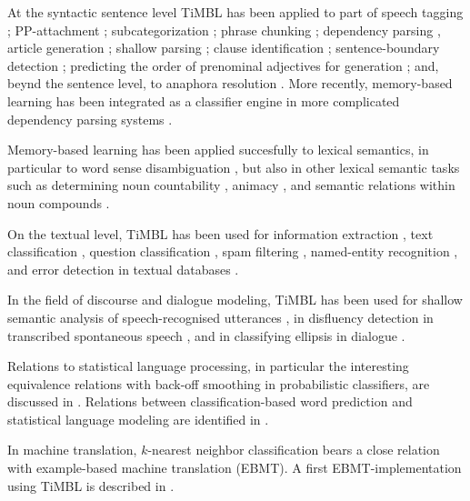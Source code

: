 \documentclass{report}
\begin{document}
At the syntactic sentence level TiMBL has been applied to part of
speech tagging \cite{Daelemans+96b,Zavrel+99,Halteren+01};
PP-attachment \cite{Zavrel+97b}; subcategorization \cite{Buchholz98};
phrase chunking \cite{Veenstra98,Sang+99}; dependency parsing
\cite{Canisius+06b}, article generation \cite{Minnen+00}; shallow
parsing \cite{Daelemans+99a,Buchholz+99,Yeh00}; clause identification
\cite{Orasan00,Sang01}; sentence-boundary detection
\cite{Stevenson+00}; predicting the order of prenominal adjectives for
generation \cite{Malouf00}; and, beynd the sentence level, to anaphora
resolution \cite{Preiss02,Mitkov+02,Hoste05}. More recently,
memory-based learning has been integrated as a classifier engine in
more complicated dependency parsing systems
\cite{Nivre+04,Sagae+05,Canisius+06b}.

Memory-based learning has been applied succesfully to lexical
semantics, in particular to word sense disambiguation
\cite{Veenstra+00,Stevenson+99,Kokkinakis00,Mihalcea02,Hoste+02,DeCadt+04},
but also in other lexical semantic tasks such as determining noun
countability \cite{Baldwin+03}, animacy \cite{Orasan+01}, and semantic
relations within noun compounds \cite{Kim+06b,Nastase+06}.

On the textual level, TiMBL has been used for information extraction
\cite{Zavrel+00b,Zavrel+03,Ahn06}, text classification
\cite{Spitters00}, question classification \cite{Garcia+06,Dridan+07},
spam filtering \cite{Androutsopoulos+00}, named-entity recognition
\cite{Buchholz+00,Hendrickx+03,DeMeulder+03,Sporleder+06b,Leveling+06},
and error detection in textual databases \cite{Sporleder+06}.

In the field of discourse and dialogue modeling, TiMBL has been used
for shallow semantic analysis of speech-recognised utterances
\cite{Gustafson+99,Krahmer+01,VandenBosch+01,Lendvai+02a,Lendvai+03},
in disfluency detection in transcribed spontaneous speech
\cite{Lendvai+03c}, and in classifying ellipsis in dialogue
\cite{Fernandez+04}.

Relations to statistical language processing, in particular the
interesting equivalence relations with back-off smoothing in
probabilistic classifiers, are discussed in
\cite{Zavrel+97}. Relations between classification-based word
prediction and statistical language modeling are identified in
\cite{VandenBosch05,VandenBosch06}.

In machine translation, $k$-nearest neighbor classification bears a
close relation with example-based machine translation (EBMT). A first
EBMT-implementation using TiMBL is described in \cite{VandenBosch+07}.
\end{document}
